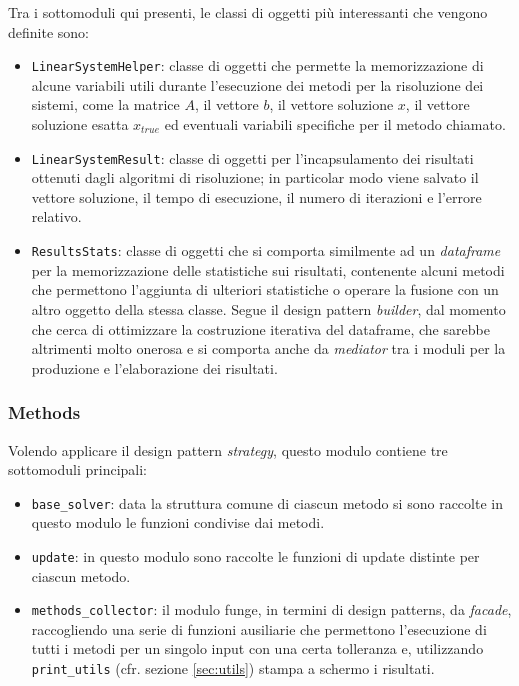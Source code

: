 \documentclass[12pt]{article}
\begin{document}
Tra i sottomoduli qui presenti, le classi di oggetti più interessanti che vengono definite sono: 
\begin{itemize}
    \item \texttt{LinearSystemHelper}: classe di oggetti che permette la memorizzazione di alcune variabili utili durante l'esecuzione dei metodi per la risoluzione dei sistemi, come la matrice $A$, il vettore $b$, il vettore soluzione $x$, il vettore soluzione esatta $x_{true}$ ed eventuali variabili specifiche per il metodo chiamato.
    \item \texttt{LinearSystemResult}: classe di oggetti per l'incapsulamento dei risultati ottenuti dagli algoritmi di risoluzione; in particolar modo viene salvato il vettore soluzione, il tempo di esecuzione, il numero di iterazioni e l'errore relativo.
    \item \texttt{ResultsStats}: classe di oggetti che si comporta similmente ad un \textit{dataframe} per la memorizzazione delle statistiche sui risultati, contenente alcuni metodi che permettono l'aggiunta di ulteriori statistiche o operare la fusione con un altro oggetto della stessa classe. Segue il design pattern \textit{builder}, dal momento che cerca di ottimizzare la costruzione iterativa del dataframe, che sarebbe altrimenti molto onerosa e si comporta anche da \textit{mediator} tra i moduli per la produzione e l'elaborazione dei risultati.
\end{itemize}

\subsubsection{Methods} \label{sec:methods}

Volendo applicare il design pattern \textit{strategy}, questo modulo contiene tre sottomoduli principali:
\begin{itemize}
    \item \texttt{base\_solver}: data la struttura comune di ciascun metodo si sono raccolte in questo modulo le funzioni condivise dai metodi.
    \item \texttt{update}: in questo modulo sono raccolte le funzioni di update distinte per ciascun metodo.
    \item \texttt{methods\_collector}: il modulo funge, in termini di design patterns, da \textit{facade}, raccogliendo una serie di funzioni ausiliarie che permettono l'esecuzione di tutti i metodi per un singolo input con una certa tolleranza e, utilizzando \texttt{print\_utils} (cfr. sezione \ref{sec:utils}) stampa a schermo i risultati.
\end{itemize}
\end{document}
